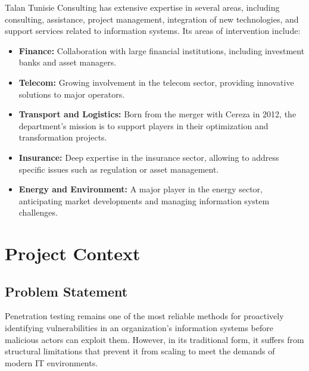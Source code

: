 \documentclass[12pt,a4paper]{report}
\begin{document}
Talan Tunisie Consulting has extensive expertise in several areas, including
consulting, assistance, project management, integration of new technologies, and
support services related to information systems. Its areas of intervention include:

\begin{itemize}
    \item \textbf{Finance:} Collaboration with large financial institutions, including
    investment banks and asset managers.
    \item \textbf{Telecom:} Growing involvement in the telecom sector, providing
    innovative solutions to major operators.
    \item \textbf{Transport and Logistics:} Born from the merger with Cereza in 2012,
    the department's mission is to support players in their optimization and
    transformation projects.
    \item \textbf{Insurance:} Deep expertise in the insurance sector, allowing to
    address specific issues such as regulation or asset management.
    \item \textbf{Energy and Environment:} A major player in the energy sector,
    anticipating market developments and managing information system challenges.
\end{itemize}

\section{Project Context}

\subsection{Problem Statement}

Penetration testing remains one of the most reliable methods for proactively
identifying vulnerabilities in an organization's information systems before malicious
actors can exploit them. However, in its traditional form, it suffers from structural
limitations that prevent it from scaling to meet the demands of modern IT environments.
\end{document}
